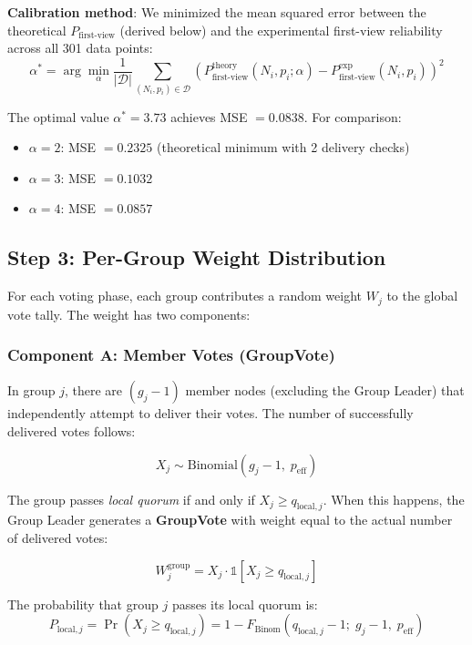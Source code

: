 \documentclass[12pt,a4paper]{article}
\begin{document}
\textbf{Calibration method}: We minimized the mean squared error between the theoretical $P_{\text{first-view}}$ (derived below) and the experimental first-view reliability across all 301 data points:
\[
  \alpha^* = \arg\min_{\alpha} \frac{1}{|\mathcal{D}|} \sum_{(N_i, p_i) \in \mathcal{D}} \left( P_{\text{first-view}}^{\text{theory}}(N_i, p_i; \alpha) - P_{\text{first-view}}^{\text{exp}}(N_i, p_i) \right)^2
\]

The optimal value $\alpha^* = 3.73$ achieves MSE $= 0.0838$. For comparison:
\begin{itemize}
  \item $\alpha = 2$: MSE $= 0.2325$ (theoretical minimum with 2 delivery checks)
  \item $\alpha = 3$: MSE $= 0.1032$
  \item $\alpha = 4$: MSE $= 0.0857$
\end{itemize}

\subsection{Step 3: Per-Group Weight Distribution}

For each voting phase, each group contributes a random weight $W_j$ to the global vote tally. The weight has two components:

\subsubsection{Component A: Member Votes (GroupVote)}

In group $j$, there are $(g_j - 1)$ member nodes (excluding the Group Leader) that independently attempt to deliver their votes. The number of successfully delivered votes follows:

\begin{equation}
  X_j \sim \text{Binomial}(g_j - 1, \; p_{\text{eff}})
  \label{eq:Xj}
\end{equation}

The group passes \emph{local quorum} if and only if $X_j \geq q_{\text{local},j}$. When this happens, the Group Leader generates a \textbf{GroupVote} with weight equal to the actual number of delivered votes:

\begin{equation}
  W_j^{\text{group}} = X_j \cdot \mathbb{1}[X_j \geq q_{\text{local},j}]
  \label{eq:Wgroup}
\end{equation}

The probability that group $j$ passes its local quorum is:
\begin{equation}
  P_{\text{local},j} = \Pr(X_j \geq q_{\text{local},j}) = 1 - F_{\text{Binom}}(q_{\text{local},j} - 1;\; g_j - 1, \; p_{\text{eff}})
  \label{eq:Plocal}
\end{equation}
\end{document}
